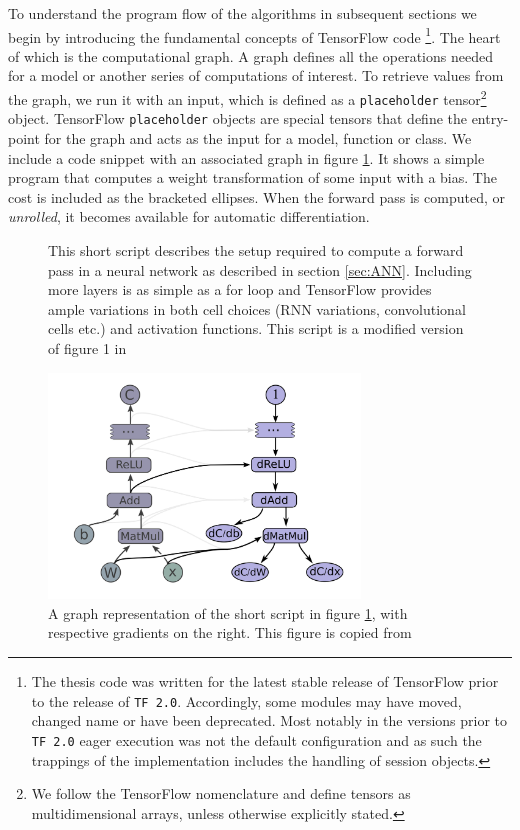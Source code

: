 To understand the program flow of the algorithms in subsequent sections we begin by introducing the fundamental concepts of TensorFlow code \footnote{The thesis code was written for the latest stable release of TensorFlow prior to the release of \lstinline{TF 2.0}. Accordingly, some modules may have moved, changed name or have been deprecated. Most notably in the versions prior to \lstinline{TF 2.0} eager execution was not the default configuration and as such the trappings of the implementation includes the handling of session objects.}. The heart of which is the computational graph. A graph defines all the operations needed for a model or another series of computations of interest. To retrieve values from the graph, we run it with an input, which is defined as a \lstinline{placeholder} tensor\footnote{We follow the TensorFlow nomenclature and define tensors as multidimensional arrays, unless otherwise explicitly stated.} object. TensorFlow \lstinline{placeholder} objects are special tensors that define the entry-point for the graph and acts as the input for a model, function or class. We include a code snippet with an associated graph in figure \ref{fig:graph}. It shows a simple program that computes a weight transformation of some input with a bias. The cost is included as the bracketed ellipses. When the forward pass is computed, or \textit{unrolled}, it becomes available for automatic differentiation. 

\begin{figure}
\centering
\begin{minipage}[c]{\linewidth}

\end{minipage}
\caption[A forward pass in TensorFlow]{This short script describes the setup required to compute a forward pass in a neural network as described in section \ref{sec:ANN}. Including more layers is as simple as a for loop and TensorFlow provides ample variations in both cell choices (RNN variations, convolutional cells etc.) and activation functions. This script is a modified version of figure 1 in \cite{tensorflow}}\label{fig:graph}
\end{figure}

\begin{figure}
\centering
\includegraphics[height=6cm]{../snippets/gradients_graph.png}
\caption[Graph representation of the forward pass and gradients of a simple dense neural network]{A graph representation of the short script in figure \ref{fig:graph}, with respective gradients on the right. This figure is copied from \citet{tensorflow}}\label{fig:grad_graph}
\end{figure}

